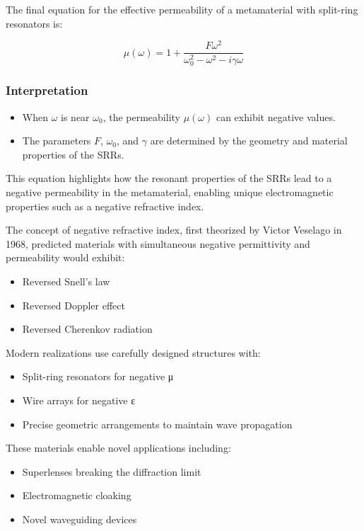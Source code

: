 \documentclass[
  a4paper,
]{book}
\providecommand{\tightlist}{%
  \setlength{\itemsep}{0pt}\setlength{\parskip}{0pt}}
\begin{document}
\begin{tcolorbox}
The final equation for the effective permeability of a metamaterial with
split-ring resonators is:

\[ \mu(\omega) = 1 + \frac{F\omega^2}{\omega_0^2 - \omega^2 - i\gamma\omega} \]

\subsubsection{Interpretation}\label{interpretation}

\begin{itemize}
\tightlist
\item
  When \(\omega\) is near \(\omega_0\), the permeability \(\mu(\omega)\)
  can exhibit negative values.
\item
  The parameters \(F\), \(\omega_0\), and \(\gamma\) are determined by
  the geometry and material properties of the SRRs.
\end{itemize}

This equation highlights how the resonant properties of the SRRs lead to
a negative permeability in the metamaterial, enabling unique
electromagnetic properties such as a negative refractive index.

\end{tcolorbox}

The concept of negative refractive index, first theorized by Victor
Veselago in 1968, predicted materials with simultaneous negative
permittivity and permeability would exhibit:

\begin{itemize}
\tightlist
\item
  Reversed Snell's law
\item
  Reversed Doppler effect
\item
  Reversed Cherenkov radiation
\end{itemize}

Modern realizations use carefully designed structures with:

\begin{itemize}
\tightlist
\item
  Split-ring resonators for negative μ
\item
  Wire arrays for negative ε
\item
  Precise geometric arrangements to maintain wave propagation
\end{itemize}

These materials enable novel applications including:

\begin{itemize}
\tightlist
\item
  Superlenses breaking the diffraction limit
\item
  Electromagnetic cloaking
\item
  Novel waveguiding devices
\end{itemize}
\end{document}
